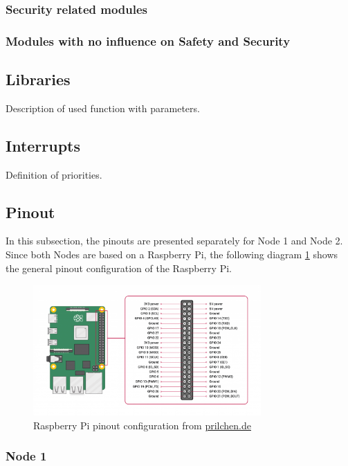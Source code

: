 \subsubsection{Security related modules}

\subsubsection{Modules with no influence on Safety and Security}

\subsection{Libraries}

Description of used function with parameters.


\subsection{Interrupts}

Definition of priorities.

\subsection{Pinout}

In this subsection, the pinouts are presented separately for Node 1 and Node 2. Since both Nodes are based on a Raspberry Pi, the following diagram \ref{fig:raspi} shows the general pinout configuration of the Raspberry Pi.

\begin{figure}[h]
	\includegraphics[height=50mm]{images/GPIO-Pinout-Diagram-2.png}
	\centering
	\caption{Raspberry Pi pinout configuration from \href{https://prilchen.de/raspberry-pis-gpio-ein-tor-zu-unzaehligen-projekten/} {prilchen.de}}
	\label{fig:raspi}
\end{figure}

\subsubsection{Node 1}

